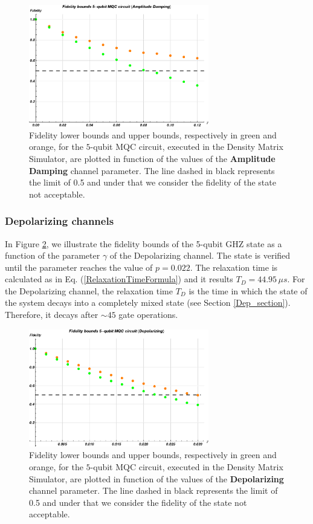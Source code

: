 \begin{figure}[h!]
\centering \includegraphics[width=0.7\textwidth]{./chapter3/Cirq_nuovo/Amp_gamma.eps}
\caption{\label{AmplitudeDamping_metodo} Fidelity lower bounds and upper bounds, respectively in green and orange, for the $5$-qubit MQC circuit, executed in the Density Matrix Simulator, are plotted in function of the values of the \textbf{Amplitude Damping} channel parameter. The line dashed in black represents the limit of 0.5 and under that we consider the fidelity of the state not acceptable.}
\end{figure}


\subsubsection{Depolarizing channels}

In Figure \ref{Depolarizing_metodo}, we illustrate the fidelity bounds of the 5-qubit GHZ state as a function of the parameter $\gamma$ of the Depolarizing channel. The state is verified until the parameter reaches the value of $p=0.022$. The relaxation time is calculated as in Eq. (\ref{RelaxationTimeFormula}) and it results $T_D=44.95\, \mu s$. For the Depolarizing channel, the relaxation time $T_D$ is the time in which the state of the system decays into a completely mixed state (see Section \ref{Dep_section}).
Therefore, it decays after $\sim45$ gate operations.

\begin{figure}[h!]
\centering \includegraphics[width=0.7\textwidth]{./chapter3/Cirq_nuovo/Dep_p.eps}
\caption{\label{Depolarizing_metodo} Fidelity lower bounds and upper bounds, respectively in green and orange, for the $5$-qubit MQC circuit, executed in the Density Matrix Simulator, are plotted in function of the values of the \textbf{Depolarizing} channel parameter. The line dashed in black represents the limit of 0.5 and under that we consider the fidelity of the state not acceptable.
}
\end{figure}

